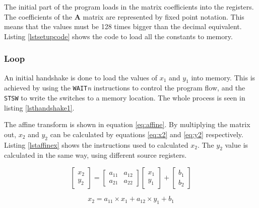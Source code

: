 The initial part of the program loads in the matrix coefficients into the registers. 
The coefficients of the \textbf{A} matrix are represented by fixed point notation. 
This means that the values must be 128 times bigger than the decimal equivalent.
Listing \ref{lstsetupcode} shows the code to load all the constants to memory.




\subsubsection{Loop}

An initial handshake is done to load the values of $x_1$ and $y_1$ into memory. 
This is achieved by using the \texttt{WAIT}\textit{n} instructions to control the program flow, and the \texttt{STSW} to write the switches to a memory location. 
The whole process is seen in listing \ref{lsthandshake1}.




The affine transform is shown in equation \eqref{eq:affine}.
By multiplying the matrix out, $x_2$ and $y_2$ can be calculated by equations \eqref{eq:x2} and \eqref{eq:y2} respectively. 
Listing \ref{lstaffinex} shows the instructions used to calculated $x_2$. 
The $y_2$ value is calculated in the same way, using different source registers.

\begin{equation}\label{eq:affine}
\begin{bmatrix}
x_2 \\
y_2 
\end{bmatrix}
=
\begin{bmatrix}
a_{11} & a_{12} \\
a_{21} & a_{22} 
\end{bmatrix}
\begin{bmatrix}
x_1 \\
y_1
\end{bmatrix}
+
\begin{bmatrix}
b_1 \\
b_2
\end{bmatrix}
\end{equation}

\begin{equation}\label{eq:x2}
x_2 = a_{11} \times x_1 + a_{12} \times y_1 + b_1
\end{equation}

